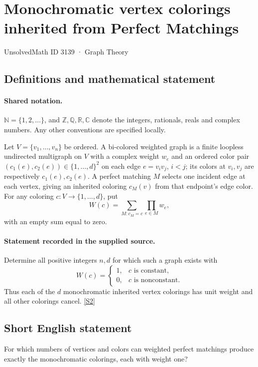 \documentclass[11pt]{article}
\newcommand{\sref}[2]{\hyperlink{source:#1:#2}{[S#2]}}
\begin{document}
\setcounter{section}{3138}
\section{Monochromatic vertex colorings inherited from Perfect Matchings}\label{3139}
{\small\sffamily UnsolvedMath ID 3139 · Graph Theory}
\subsection{Definitions and mathematical statement}

\paragraph{Shared notation.}$\mathbb N=\{1,2,\ldots\}$, and $\mathbb Z,\mathbb Q,\mathbb R,\mathbb C$ denote the integers, rationals, reals and complex numbers. Any other conventions are specified locally.


Let $V=\{v_1,\ldots,v_n\}$ be ordered. A bi-colored weighted graph is a finite loopless undirected multigraph on $V$ with a complex weight $w_e$ and an ordered color pair $(c_1(e),c_2(e))\in\{1,\ldots,d\}^2$ on each edge $e=v_iv_j$, $i<j$; its colors at $v_i,v_j$ are respectively $c_1(e),c_2(e)$. A perfect matching $M$ selects one incident edge at each vertex, giving an inherited coloring $c_M(v)$ from that endpoint's edge color. For any coloring $c:V\to\{1,\ldots,d\}$, put \[W(c)=\sum_{M:c_M=c}\prod_{e\in M}w_e,\] with an empty sum equal to zero.
\paragraph{Statement recorded in the supplied source.}
Determine all positive integers $n,d$ for which such a graph exists with \[W(c)=\begin{cases}1,&c\text{ is constant},\\0,&c\text{ is nonconstant}.\end{cases}\] Thus each of the $d$ monochromatic inherited vertex colorings has unit weight and all other colorings cancel. \sref{3139}{2}
\subsection{Short English statement}
For which numbers of vertices and colors can weighted perfect matchings produce exactly the monochromatic colorings, each with weight one?
\end{document}
